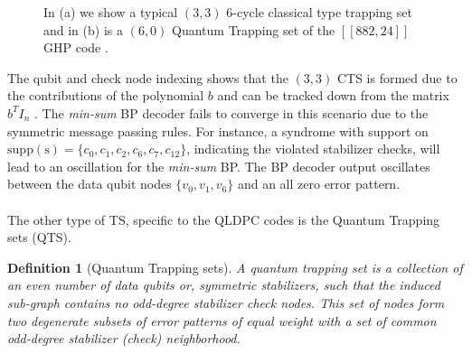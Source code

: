 \documentclass[%
 reprint,
 amsmath,amssymb,
 aps,
pra,
showkeys,
]{revtex4-2}
\newtheorem{definition}{Definition}[section]
\begin{document}
\begin{figure}[t]
{{
}
}
\caption{In (a) we show a typical $(3,3)$ 6-cycle classical type trapping set \cite{chytas2024collective} and in (b) is a $(6,0)$ Quantum Trapping set of the $[[882,24]]$ GHP code \cite{chytas2024collective}.}
\label{fig:trapping-sets-of-882-24}
\end{figure}
The qubit and check node indexing shows that the $(3,3)$ CTS is formed due to the contributions of the polynomial $b$ and can be tracked down from the matrix $b^T I_n$ \cite{chytas2024collective}.
The \textit{min-sum} BP decoder fails to converge in this scenario due to the symmetric message passing rules.
For instance, a syndrome with support on $\mathrm{supp}(\mathrm{s}) = \{c_0,c_1,c_2,c_6,c_7,c_{12}\}$, indicating the violated stabilizer checks, will lead to an oscillation for the \textit{min-sum} BP.
The BP decoder output oscillates between the data qubit nodes $\{v_0, v_1, v_6\}$ and an all zero error pattern.
\\\\
The other type of TS, specific to the QLDPC codes is the Quantum Trapping sets (QTS).
\begin{definition}[Quantum Trapping sets]
    \label{def:quantum trapping sets}
    A quantum trapping set is a collection of an even number of data qubits or, symmetric stabilizers, such that the induced sub-graph contains no odd-degree stabilizer check nodes. 
    This set of nodes form two degenerate subsets of error patterns of equal weight with a set of common odd-degree stabilizer (check) neighborhood.
\end{definition}
\end{document}
